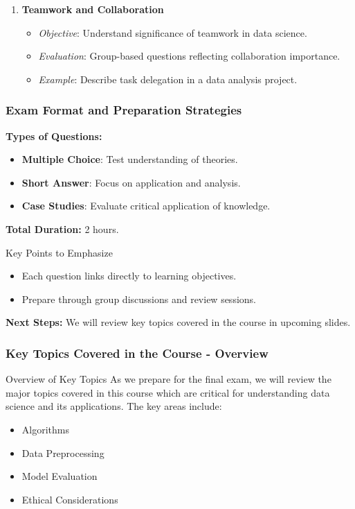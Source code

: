 \documentclass[aspectratio=169]{beamer}
\begin{document}
\begin{frame}[fragile]
\begin{enumerate}
        \item \textbf{Teamwork and Collaboration}
        \begin{itemize}
            \item \textit{Objective}: Understand significance of teamwork in data science.
            \item \textit{Evaluation}: Group-based questions reflecting collaboration importance.
            \item \textit{Example}: Describe task delegation in a data analysis project.
        \end{itemize}
    \end{enumerate}
\end{frame}

\begin{frame}[fragile]
    \frametitle{Exam Format and Preparation Strategies}
    \textbf{Types of Questions:}
    \begin{itemize}
        \item \textbf{Multiple Choice}: Test understanding of theories.
        \item \textbf{Short Answer}: Focus on application and analysis.
        \item \textbf{Case Studies}: Evaluate critical application of knowledge.
    \end{itemize}

    \textbf{Total Duration:} 2 hours.

    \begin{block}{Key Points to Emphasize}
        \begin{itemize}
            \item Each question links directly to learning objectives.
            \item Prepare through group discussions and review sessions.
        \end{itemize}
    \end{block}
    
    \textbf{Next Steps:} We will review key topics covered in the course in upcoming slides.
\end{frame}

\begin{frame}[fragile]
    \frametitle{Key Topics Covered in the Course - Overview}
    \begin{block}{Overview of Key Topics}
        As we prepare for the final exam, we will review the major topics covered in this course which are critical for understanding data science and its applications. The key areas include:
    \end{block}
    \begin{itemize}
        \item Algorithms
        \item Data Preprocessing
        \item Model Evaluation
        \item Ethical Considerations
    \end{itemize}
\end{frame}
\end{document}
